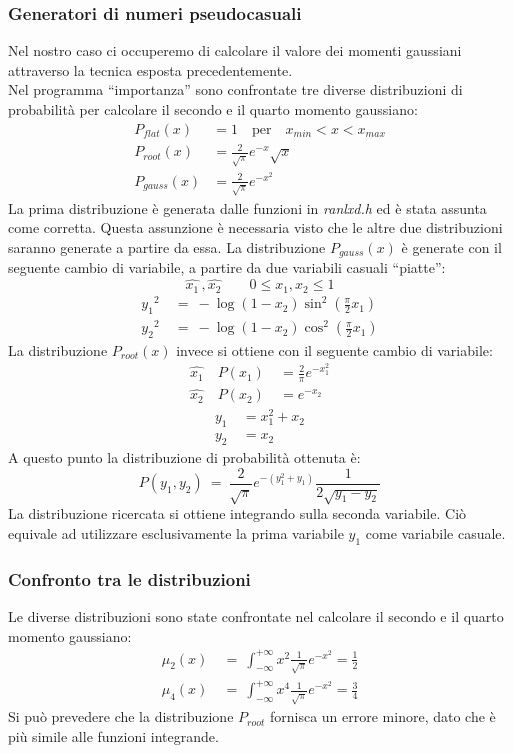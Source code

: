 \subsubsection{Generatori di numeri pseudocasuali}
Nel nostro caso ci occuperemo di calcolare il valore dei momenti gaussiani attraverso la tecnica esposta precedentemente. \\
Nel programma ``importanza'' sono confrontate tre diverse distribuzioni di probabilità per calcolare il secondo e il quarto momento gaussiano:
\begin{align*}
\nonumber
P_{flat}(x) &= 1 \quad \mbox{per} \quad x_{min} < x < x_{max}\\
\nonumber
P_{root}(x) &= \frac{2}{\sqrt{\pi}} e^{-x} \sqrt{x}\\
\nonumber
P_{gauss}(x) &= \frac{2}{\sqrt{\pi}} e^{-x^2}
\end{align*}
La prima distribuzione è generata dalle funzioni in \emph{ranlxd.h} ed è stata assunta come corretta. Questa assunzione è necessaria visto che le altre
due distribuzioni saranno generate a partire da essa. La distribuzione $P_{gauss}(x)$ è generate con il seguente cambio di variabile, a partire
da due variabili casuali ``piatte'':
$$
\hat{x_1} \, , \hat{x_2} \qquad 0 \leq x_1 , x_2 \leq 1
$$
\begin{align*}
 \nonumber
 {y_1}^2 \ &= \ - \log(1-x_2) \sin^2\left(\frac{\pi}{2} x_1 \right) \\ 
 \nonumber
 {y_2}^2 \ &= \ - \log(1-x_2) \cos^2\left(\frac{\pi}{2}x_1 \right) 
\end{align*}
La distribuzione $P_{root}(x)$ invece si ottiene con il seguente cambio di variabile:
\begin{align*}
 \nonumber
 \hat{x_1} \quad P(x_1) \ &= \frac{2}{\pi} e^{-x_1^2} \\
 \hat{x_2} \quad P(x_2) \ &= e^{-x_2}
\end{align*}
\begin{align*}
 y_1 \ &= x_1^2 + x_2 \\
 y_2 &= x_2
\end{align*}
A questo punto la distribuzione di probabilità ottenuta è:
$$
P(y_1,y_2) \ = \ \frac{2}{\sqrt{\pi}} e^{-\left(y_1^2 + y_1\right)}\frac{1}{2\sqrt{y_1 -y_2}} 
$$
La distribuzione ricercata si ottiene integrando sulla seconda variabile. Ciò equivale ad utilizzare esclusivamente la prima variabile $y_1$
come variabile casuale.
\subsubsection{Confronto tra le distribuzioni}
Le diverse distribuzioni sono state confrontate nel calcolare il secondo e il quarto momento gaussiano:
\begin{align*}
\mu_2(x) \ &= \ \int_{-\infty}^{+\infty} x^2 \frac{1}{\sqrt{\pi}} e^{-x^2}  = \frac{1}{2}\\
\mu_4(x) \ &= \ \int_{-\infty}^{+\infty} x^4  \frac{1}{\sqrt{\pi}} e^{-x^2} = \frac{3}{4}
\end{align*}
Si può prevedere che la distribuzione $P_{root}$ fornisca un errore minore, dato che è più simile alle funzioni integrande.\\

